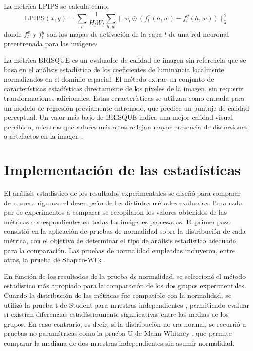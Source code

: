 La métrica LPIPS se calcula como:
\[
\mathrm{LPIPS}(x, y) = \sum_l \frac{1}{H_l W_l} \sum_{h,w} \| w_l \odot (f_l^x(h,w) - f_l^y(h,w)) \|_2^2
\]
donde \(f_l^x\) y \(f_l^y\) son los mapas de activación de la capa \(l\) de una red neuronal preentrenada para las imágenes

La métrica BRISQUE es un evaluador de calidad de imagen sin referencia que se basa en el análisis estadístico de los coeficientes de luminancia localmente normalizados en el dominio espacial. El método extrae un conjunto de características estadísticas directamente de los píxeles de la imagen, sin requerir transformaciones adicionales. Estas características se utilizan como entrada para un modelo de regresión previamente entrenado, que predice un puntaje de calidad perceptual. Un valor más bajo de BRISQUE indica una mejor calidad visual percibida, mientras que valores más altos reflejan mayor presencia de distorsiones o artefactos en la imagen \cite{BRISQUE,kastryulin2022piq}. 

\section{Implementación de las estadísticas}\label{section:statistics-implementation}

El análisis estadístico de los resultados experimentales se diseñó para comparar de manera rigurosa el desempeño de los distintos métodos evaluados. Para cada par de experimentos a comparar se recopilaron los valores obtenidos de las métricas correspondientes en todas las imágenes procesadas. El primer paso consistió en la aplicación de pruebas de normalidad sobre la distribución de cada métrica, con el objetivo de determinar el tipo de análisis estadístico adecuado para la comparación. Las pruebas de normalidad empleadas incluyeron, entre otras, la prueba de Shapiro-Wilk \cite{shapiro1965analysis}.

En función de los resultados de la prueba de normalidad, se seleccionó el método estadístico más apropiado para la comparación de los dos grupos experimentales. Cuando la distribución de las métricas fue compatible con la normalidad, se utilizó la prueba t de Student para muestras independientes \cite{molina2022paso}, permitiendo evaluar si existían diferencias estadísticamente significativas entre las medias de los grupos. En caso contrario, es decir, si la distribución no era normal, se recurrió a pruebas no paramétricas como la prueba U de Mann-Whitney \cite{mann1947test}, que permite comparar la mediana de dos muestras independientes sin asumir normalidad.

